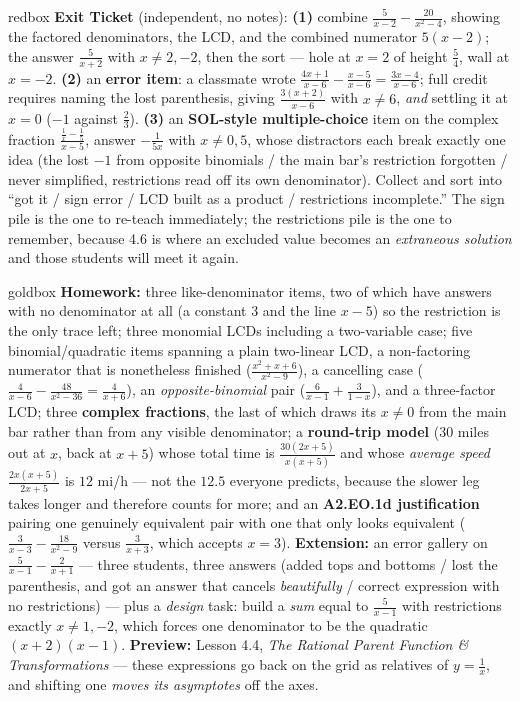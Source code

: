 \documentclass[10pt]{article}
\begin{document}
\begin{skillbox}{redbox}
\textbf{Exit Ticket} (independent, no notes): \textbf{(1)} combine
$\frac{5}{x-2}-\frac{20}{x^2-4}$, showing the factored denominators, the LCD, and the combined
numerator $5(x-2)$; the answer $\frac{5}{x+2}$ with $x\neq2,-2$, then the sort --- hole at $x=2$ of
height $\frac54$, wall at $x=-2$. \textbf{(2)} an \textbf{error item}: a classmate wrote
$\frac{4x+1}{x-6}-\frac{x-5}{x-6}=\frac{3x-4}{x-6}$; full credit requires naming the lost parenthesis,
giving $\frac{3(x+2)}{x-6}$ with $x\neq6$, \emph{and} settling it at $x=0$ ($-1$ against $\frac23$).
\textbf{(3)} an \textbf{SOL-style multiple-choice} item on the complex fraction
$\frac{\frac1x-\frac15}{x-5}$, answer $-\frac{1}{5x}$ with $x\neq0,5$, whose distractors each break
exactly one idea (the lost $-1$ from opposite binomials / the main bar's restriction forgotten /
never simplified, restrictions read off its own denominator). Collect and sort into ``got it / sign
error / LCD built as a product / restrictions incomplete.'' The sign pile is the one to re-teach
immediately; the restrictions pile is the one to remember, because 4.6 is where an excluded value
becomes an \emph{extraneous solution} and those students will meet it again.
\end{skillbox}

\begin{skillbox}{goldbox}
\textbf{Homework:} three like-denominator items, two of which have answers with no denominator at all
(a constant $3$ and the line $x-5$) so the restriction is the only trace left; three monomial LCDs
including a two-variable case; five binomial/quadratic items spanning a plain two-linear LCD, a
non-factoring numerator that is nonetheless finished ($\frac{x^2+x+6}{x^2-9}$), a cancelling case
($\frac{4}{x-6}-\frac{48}{x^2-36}=\frac{4}{x+6}$), an \emph{opposite-binomial} pair
($\frac{6}{x-1}+\frac{3}{1-x}$), and a three-factor LCD; three \textbf{complex fractions}, the last of
which draws its $x\neq0$ from the main bar rather than from any visible denominator; a \textbf{round-trip
model} ($30$ miles out at $x$, back at $x+5$) whose total time is $\frac{30(2x+5)}{x(x+5)}$ and whose
\emph{average speed} $\frac{2x(x+5)}{2x+5}$ is $12$ mi/h --- not the $12.5$ everyone predicts, because
the slower leg takes longer and therefore counts for more; and an \textbf{A2.EO.1d justification} pairing
one genuinely equivalent pair with one that only looks equivalent
($\frac{3}{x-3}-\frac{18}{x^2-9}$ versus $\frac{3}{x+3}$, which accepts $x=3$). \textbf{Extension:} an
error gallery on $\frac{5}{x-1}-\frac{2}{x+1}$ --- three students, three answers (added tops and
bottoms / lost the parenthesis, and got an answer that cancels \emph{beautifully} / correct expression
with no restrictions) --- plus a \emph{design} task: build a \emph{sum} equal to $\frac{5}{x-1}$ with
restrictions exactly $x\neq1,-2$, which forces one denominator to be the quadratic $(x+2)(x-1)$.
\textbf{Preview:} Lesson 4.4, \emph{The Rational Parent Function \& Transformations} --- these
expressions go back on the grid as relatives of $y=\frac1x$, and shifting one \emph{moves its
asymptotes} off the axes.
\end{skillbox}
\end{document}
